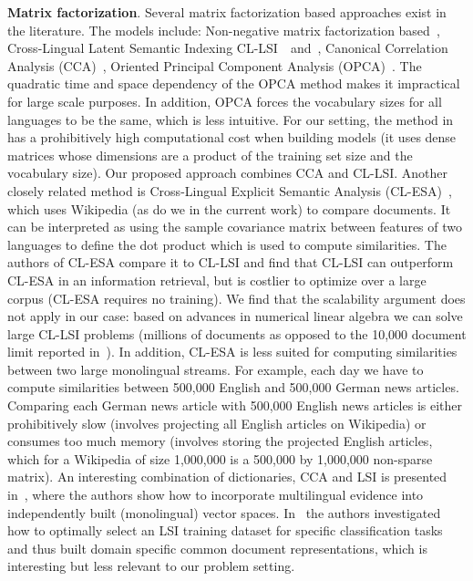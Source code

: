 \textbf{Matrix factorization}. Several matrix factorization based approaches exist in the literature. The models include: Non-negative matrix factorization based~\cite{nonnegfactor_lsi}, Cross-Lingual Latent Semantic Indexing CL-LSI~\cite{cl_lsi}~and~\cite{multilingualBook}, Canonical Correlation Analysis (CCA)~\cite{Hotelling}, Oriented Principal Component Analysis (OPCA)~\cite{platt2010translingual}. The quadratic time and space dependency of the OPCA method makes it impractical for large scale purposes. In addition, OPCA forces the vocabulary sizes for all languages to be the same, which is less intuitive. For our setting, the method in ~\cite{nonnegfactor_lsi} has a prohibitively high computational cost when building models (it uses dense matrices whose dimensions are a product of the training set size and the vocabulary size). Our proposed approach combines CCA and CL-LSI. Another closely related method is Cross-Lingual Explicit Semantic Analysis (CL-ESA)~\cite{ESA}, which uses Wikipedia (as do we in the current work) to compare documents. It can be interpreted as using the sample covariance matrix between features of two languages to define the dot product which is used to compute similarities.
The authors of CL-ESA compare it to CL-LSI and find that CL-LSI can outperform CL-ESA in an information retrieval, but is costlier to optimize over a large corpus (CL-ESA requires no training). We find that the scalability argument does not apply in our case: based on advances in numerical linear algebra we can solve large CL-LSI problems (millions of documents as opposed to the 10,000 document limit reported in~\cite{ESA}\cite{sorg2012exploiting}). In addition, CL-ESA is less suited for computing similarities between two large monolingual streams. For example, each day we have to compute similarities between 500,000 English and 500,000 German news articles. Comparing each German news article with 500,000 English news articles is either prohibitively slow (involves projecting all English articles on Wikipedia) or consumes too much memory (involves storing the projected English articles, which for a Wikipedia of size 1,000,000 is a 500,000 by 1,000,000 non-sparse matrix). An interesting combination of
dictionaries, CCA and LSI is presented in~\cite{faruqui-dyer:2014:EACL}, where the authors show how to
incorporate multilingual evidence into independently built (monolingual) vector spaces. In~\cite{pozniak2016optimization} the authors investigated how to optimally select an LSI training dataset for specific classification tasks and thus built domain specific common document representations, which is interesting but less relevant to our problem setting.

